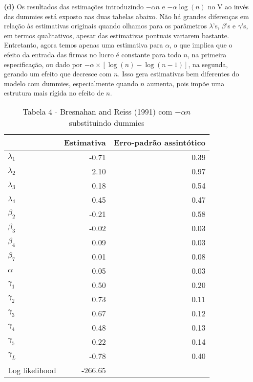 \documentclass[
  12pt,
]{article}
\begin{document}
\textbf{(d)} Os resultados das estimações introduzindo \(-\alpha n\) e
\(-\alpha \log(n)\) no V ao invés das dummies está exposto nas duas
tabelas abaixo. Não há grandes diferenças em relação às estimativas
originais quando olhamos para os parâmetros \(\lambda\)'s, \(\beta\)'s e
\(\gamma\)'s, em termos qualitativos, apesar das estimativas pontuais
variarem bastante. Entretanto, agora temos apenas uma estimativa para
\(\alpha\), o que implica que o efeito da entrada das firmas no lucro é
constante para todo \(n\), na primeira especificação, ou dado por
\(-\alpha \times [\log(n) - \log(n-1)]\), na segunda, gerando um efeito
que decresce com \(n\). Isso gera estimativas bem diferentes do modelo
com dummies, especialmente quando \(n\) aumenta, pois impõe uma
estrutura mais rígida no efeito de \(n\).

\begin{table}[H]

\caption{\label{tab:unnamed-chunk-11}Tabela 4 - Bresnahan and Reiss (1991) com $-\alpha n$ substituindo dummies}
\centering
\begin{tabular}[t]{lrr}
\toprule
  & Estimativa & Erro-padrão assintótico\\
\midrule
$\lambda_1$ & -0.71 & 0.39\\
$\lambda_2$ & 2.10 & 0.97\\
$\lambda_3$ & 0.18 & 0.54\\
$\lambda_4$ & 0.45 & 0.47\\
$\beta_2$ & -0.21 & 0.58\\
$\beta_3$ & -0.02 & 0.03\\
$\beta_4$ & 0.09 & 0.03\\
$\beta_7$ & 0.01 & 0.08\\
$\alpha$ & 0.05 & 0.03\\
$\gamma_1$ & 0.50 & 0.20\\
$\gamma_2$ & 0.73 & 0.11\\
$\gamma_3$ & 0.67 & 0.12\\
$\gamma_4$ & 0.48 & 0.13\\
$\gamma_5$ & 0.22 & 0.14\\
$\gamma_L$ & -0.78 & 0.40\\
Log likelihood & -266.65 & \\
\bottomrule
\end{tabular}
\end{table}
\end{document}
